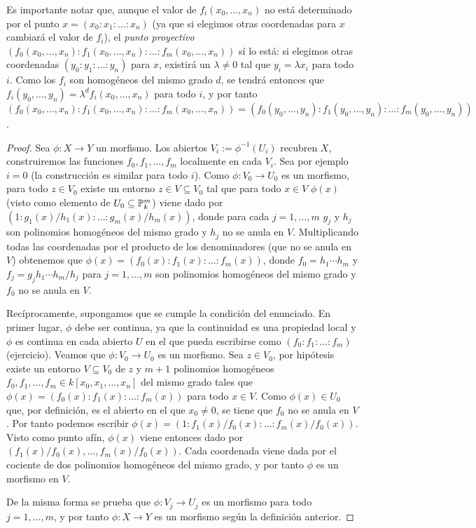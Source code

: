 \documentclass[ACGA.tex]{subfiles}
\begin{document}
Es importante notar que, aunque el valor de $f_i(x_0,\ldots,x_n)$ no está determinado por el punto $x=(x_0:x_1:\ldots:x_n)$ (ya que si elegimos otras coordenadas para $x$ cambiará el valor de $f_i$), el \emph{punto proyectivo} $(f_0(x_0,\ldots,x_n):f_1(x_0,\ldots,x_n):\ldots:f_m(x_0,\ldots,x_n))$ sí lo está: si elegimos otras coordenadas $(y_0:y_1:\ldots:y_n)$ para $x$, existirá un $\lambda\neq 0$ tal que $y_i=\lambda x_i$ para todo $i$. Como los $f_i$ son homogéneos del mismo grado $d$, se tendrá entonces que $f_i(y_0,\ldots,y_n)=\lambda^d f_i(x_0,\ldots,x_n)$ para todo $i$, y por tanto $(f_0(x_0,\ldots,x_n):f_1(x_0,\ldots,x_n):\ldots:f_m(x_0,\ldots,x_n))=(f_0(y_0,\ldots,y_n):f_1(y_0,\ldots,y_n):\ldots:f_m(y_0,\ldots,y_n))$.

\begin{proof}
 Sea $\phi:X\to Y$ un morfismo. Los abiertos $V_i:=\phi^{-1}(U_i)$ recubren $X$, construiremos las funciones $f_0,f_1,\ldots,f_m$ localmente en cada $V_i$. Sea por ejemplo $i=0$ (la construcción es similar para todo $i$). Como $\phi:V_0\to U_0$ es un morfismo, para todo $z\in V_0$ existe un entorno $z\in V\subseteq V_0$ tal que para todo $x\in V$ $\phi(x)$ (visto como elemento de $U_0\subseteq\mathbb{P}^m_k$) viene dado por $(1:g_1(x)/h_1(x):\ldots:g_m(x)/h_m(x))$, donde para cada $j=1,\ldots,m$ $g_j$ y $h_j$ son polinomios homogéneos del mismo grado y $h_j$ no se anula en $V$. Multiplicando todas las coordenadas por el producto de los denominadores (que no se anula en $V$) obtenemos que $\phi(x)=(f_0(x):f_1(x):\ldots:f_m(x))$, donde $f_0=h_1\cdots h_m$ y $f_j=g_jh_1\cdots h_m/h_j$ para $j=1,\ldots,m$ son polinomios homogéneos del mismo grado y $f_0$ no se anula en $V$.

Recíprocamente, supongamos que se cumple la condición del enunciado. En primer lugar, $\phi$ debe ser continua, ya que la continuidad es una propiedad local y $\phi$ es continua en cada abierto $U$ en el que pueda escribirse como $(f_0:f_1:\ldots:f_m)$ (ejercicio). Veamos que $\phi:V_0\to U_0$ es un morfismo. Sea $z\in V_0$, por hipótesis existe un entorno $V\subseteq V_0$ de $z$ y $m+1$ polinomios homogéneos $f_0,f_1,\ldots,f_m\in k[x_0,x_1,\ldots,x_n]$ del mismo grado tales que $\phi(x)=(f_0(x):f_1(x):\ldots:f_m(x))$ para todo $x\in V$. Como $\phi(x)\in U_0$ que, por definición, es el abierto en el que $x_0\neq 0$, se tiene que $f_0$ no se anula en $V$. Por tanto podemos escribir $\phi(x)=(1:f_1(x)/f_0(x):\ldots:f_m(x)/f_0(x))$. Visto como punto afín, $\phi(x)$ viene entonces dado por $(f_1(x)/f_0(x),\ldots,f_m(x)/f_0(x))$. Cada coordenada viene dada por el cociente de dos polinomios homogéneos del mismo grado, y por tanto $\phi$ es un morfismo en $V$.

De la misma forma se prueba que $\phi:V_j\to U_j$ es un morfismo para todo $j=1,\ldots,m$, y por tanto $\phi:X\to Y$ es un morfismo según la definición anterior.
\end{proof}
\end{document}
